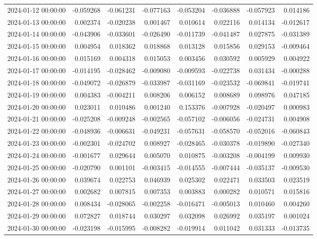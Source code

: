 \begin{tabular}{lrrrrrrr}
2024-01-12 00:00:00 & -0.059268 & -0.061231 & -0.077163 & -0.053204 & -0.036888 & -0.057923 & 0.014186 \\
2024-01-13 00:00:00 & 0.002374 & -0.020238 & 0.001467 & 0.010614 & 0.022116 & 0.014134 & -0.012617 \\
2024-01-14 00:00:00 & -0.043906 & -0.033601 & -0.026490 & -0.011739 & -0.041487 & 0.027875 & -0.031389 \\
2024-01-15 00:00:00 & 0.004954 & 0.018362 & 0.018868 & 0.013128 & 0.015856 & 0.029153 & -0.009464 \\
2024-01-16 00:00:00 & 0.015169 & 0.004318 & 0.015053 & 0.003456 & 0.030592 & 0.005929 & 0.004922 \\
2024-01-17 00:00:00 & -0.014195 & -0.028462 & -0.009080 & -0.009593 & -0.022738 & 0.031434 & -0.000288 \\
2024-01-18 00:00:00 & -0.049072 & -0.026879 & -0.033987 & -0.031169 & -0.023532 & -0.069841 & -0.019741 \\
2024-01-19 00:00:00 & 0.004383 & -0.004211 & 0.008206 & 0.006152 & 0.008689 & 0.098976 & 0.047185 \\
2024-01-20 00:00:00 & 0.023011 & 0.010486 & 0.001240 & 0.153376 & -0.007928 & -0.020497 & 0.000983 \\
2024-01-21 00:00:00 & -0.025208 & -0.009248 & -0.002565 & -0.057102 & -0.006056 & -0.024731 & 0.004908 \\
2024-01-22 00:00:00 & -0.048936 & -0.006631 & -0.049231 & -0.057631 & -0.058570 & -0.052016 & -0.060843 \\
2024-01-23 00:00:00 & -0.002301 & -0.024702 & 0.008927 & -0.028465 & -0.030378 & -0.019890 & -0.027340 \\
2024-01-24 00:00:00 & -0.001677 & 0.029644 & 0.005070 & 0.010875 & -0.003208 & -0.004199 & 0.009930 \\
2024-01-25 00:00:00 & -0.020790 & 0.001101 & -0.003415 & -0.014555 & -0.007444 & -0.035137 & -0.009530 \\
2024-01-26 00:00:00 & 0.039674 & 0.022753 & 0.046939 & 0.025302 & 0.022471 & 0.033503 & 0.023519 \\
2024-01-27 00:00:00 & 0.002682 & 0.007815 & 0.007353 & 0.003883 & 0.000282 & 0.010571 & 0.015816 \\
2024-01-28 00:00:00 & 0.008434 & -0.028065 & -0.002258 & -0.016471 & -0.005013 & 0.010460 & 0.004260 \\
2024-01-29 00:00:00 & 0.072827 & 0.018744 & 0.030297 & 0.032098 & 0.026992 & 0.035197 & 0.001024 \\
2024-01-30 00:00:00 & -0.023198 & -0.015995 & -0.008282 & -0.019914 & 0.011042 & 0.031333 & -0.013735 \\

\end{tabular}
